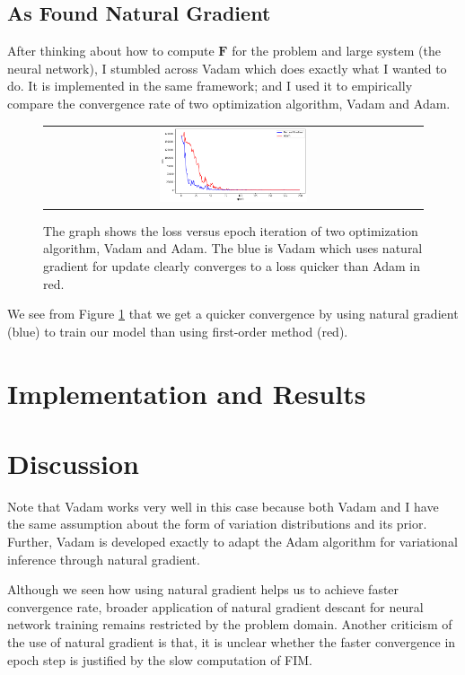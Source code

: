 \documentclass[10pt,twocolumn,letterpaper]{article}
\newcommand{\vect}[1]{\boldsymbol{\mathbf{#1}}}
\begin{document}
\subsection{As Found Natural Gradient}
After thinking about how to compute \(\vect{F}\) for the problem and large system (the neural network), I stumbled across Vadam \cite{khan2018fast} which does exactly what I wanted to do. 
It is implemented in the same framework; and I used it to empirically compare the convergence rate of two optimization algorithm, Vadam and Adam.
\begin{figure}[h]
\begin{tabular}{c}
     \includegraphics[width=0.4\textwidth]{images/vadam_compare.png}
\end{tabular}
\caption{The graph shows the loss versus epoch iteration of two optimization algorithm, Vadam and Adam. The blue is Vadam which uses natural gradient for update clearly converges to a loss quicker than Adam in red.}
    \label{fig:vadam_compare}
\end{figure}

We see from Figure \ref{fig:vadam_compare} that we get a quicker convergence by using natural gradient (blue) to train our model than using first-order method (red).

\section{Implementation and Results}


\section{Discussion}
Note that Vadam works very well in this case because both Vadam and I have the same assumption about the form of variation distributions and its prior. Further, Vadam is developed exactly to adapt the Adam algorithm for variational inference through natural gradient.

Although we seen how using natural gradient helps us to achieve faster convergence rate, broader application of natural gradient descant for neural network training remains restricted by the problem domain. 
Another criticism of the use of natural gradient is that, it is unclear whether the faster convergence in epoch step is justified by the slow computation of FIM. 
\end{document}
